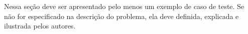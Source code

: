 
Nessa seção deve ser apresentado pelo menos um exemplo de caso de teste. Se não for especificado na descrição do problema, ela deve definida, explicada e ilustrada pelos autores.
